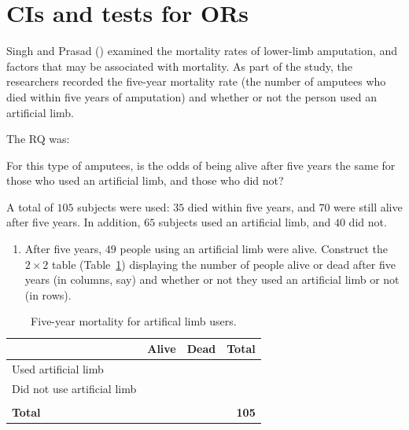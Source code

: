 \documentclass[
  11pt,
  a4paper,
  krantz2]{krantz}
\makeatletter
\providecommand{\tightlist}{%
  \setlength{\itemsep}{0pt}\setlength{\parskip}{0pt}}
\renewenvironment{quote}%
{\begin{kframe}}
{\end{kframe}}
\newenvironment{kframe}{%
\medskip{}
\setlength{\fboxsep}{.8em}
 \def\at@end@of@kframe{}%
 \ifinner\ifhmode%
  \def\at@end@of@kframe{\end{minipage}}%
  \begin{minipage}{\columnwidth}%
 \fi\fi%
 \def\FrameCommand##1{\hskip\@totalleftmargin \hskip-\fboxsep
 \colorbox{shadecolor}{##1}\hskip-\fboxsep
     \hskip-\linewidth \hskip-\@totalleftmargin \hskip\columnwidth}%
 \MakeFramed {\advance\hsize-\width
   \@totalleftmargin\z@ \linewidth\hsize
   \@setminipage}}%
 {\par\unskip\endMakeFramed%
 \at@end@of@kframe}
\renewenvironment{quote}
               {\list{}{\vspace{-0.5em}\begin{kframe}\small%
                        \rightmargin   \leftmargin
                        \parsep        \z@ \@plus\p@}%
                \item\relax}
               {\end{kframe}\endlist}
\makeatother
\begin{document}
\section{CIs and tests for ORs}\label{TestsForORs}

Singh and Prasad () examined the mortality rates of lower-limb amputation, and factors that may be associated with mortality.
As part of the study, the researchers recorded the five-year mortality rate (the number of amputees who died within five years of amputation) and whether or not the person used an artificial limb.

The RQ was:

\begin{quote}
For this type of amputees, is the odds of being alive after five years the same for those who used an artificial limb, and those who did not?
\end{quote}

A total of \(105\) subjects were used: \(35\) died within five years, and \(70\) were still alive after five years.
In addition, \(65\) subjects used an artificial limb, and \(40\) did not.

\begin{enumerate}
\def\labelenumi{\arabic{enumi}.}
\tightlist
\item
  After five years, \(49\) people using an artificial limb were alive.
  Construct the \(2\times 2\) table (Table~\ref{tab:ArtLimbMortality}) displaying the number of people alive or dead after five years (in columns, say) and whether or not they used an artificial limb or not (in rows).
\end{enumerate}

\begin{table}
\centering
\caption{\label{tab:ArtLimbMortality}Five-year mortality for artifical limb users.}
\centering
\fontsize{10}{12}\selectfont
\begin{tabular}[t]{lrrr}
\toprule
\textbf{ } & \textbf{Alive} & \textbf{Dead} & \textbf{Total}\\
\midrule
Used artificial limb &  &  & \\
\addlinespace
Did not use artificial limb &  &  & \\
\midrule\\
\addlinespace
\textbf{Total} & \textbf{} & \textbf{} & \textbf{105}\\
\bottomrule
\end{tabular}
\end{table}
\end{document}
